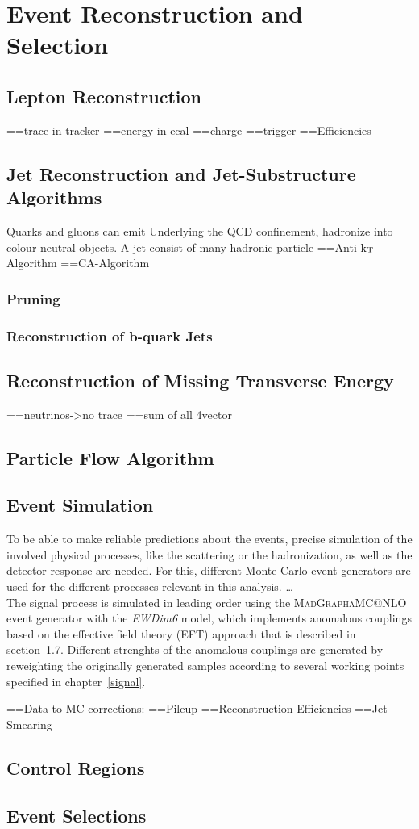 \chapter{Event Reconstruction and Selection}
\label{chap::EventReconstructionandSelection}

\section{Lepton Reconstruction}
==trace in tracker
==energy in ecal
==charge
==trigger
==Efficiencies
\section{Jet Reconstruction and Jet-Substructure Algorithms}
Quarks and gluons can emit 
Underlying the QCD confinement, 
hadronize into colour-neutral objects. 
A jet consist of many hadronic particle
==Anti-k$_{\rm T}$ Algorithm
==CA-Algorithm
\subsection{Pruning}

\label{sec:pruning}
\subsection{Reconstruction of b-quark Jets}
\section{Reconstruction of Missing Transverse Energy}
==neutrinos->no trace
==sum of all 4vector
\section{Particle Flow Algorithm}
\section{Event Simulation}
\label{sec:MC}
To be able to make reliable predictions about the events, precise simulation of the involved physical processes, like the scattering or the hadronization, as well as the detector response are needed. For this, different Monte Carlo event generators are used for the different processes relevant in this analysis.
\dots \\
The signal process is simulated in leading order using the \textsc{MadGraph\textunderscore aMC@NLO} event generator with the \textit{EWDim6} model\cite{madgraph}, which implements anomalous couplings based on the effective field theory (EFT) approach that is described in section~\ref{}. Different strenghts of the anomalous couplings are generated by reweighting the originally generated samples according to several working points specified in chapter~\ref{signal}.


=={Data to MC corrections:}
=={Pileup}
=={Reconstruction Efficiencies}
=={Jet Smearing}
\section{Control Regions}
\section{Event Selections}
